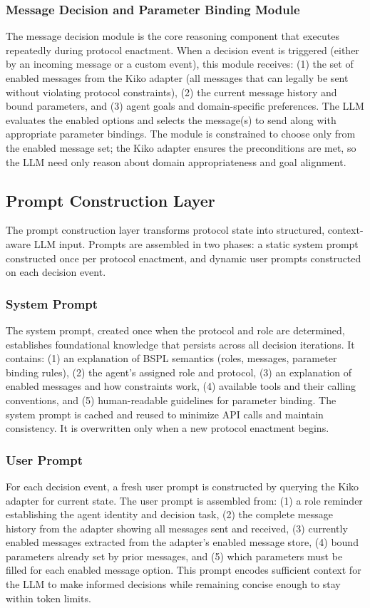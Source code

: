 \documentclass[runningheads]{llncs}
\begin{document}
\subsubsection{Message Decision and Parameter Binding Module}
The message decision module is the core reasoning component that executes repeatedly during protocol enactment. 
When a decision event is triggered (either by an incoming message or a custom event), this module receives: (1) the set of enabled messages from the Kiko adapter (all messages that can legally be sent without violating protocol constraints), (2) the current message history and bound parameters, and (3) agent goals and domain-specific preferences. 
The LLM evaluates the enabled options and selects the message(s) to send along with appropriate parameter bindings. 
The module is constrained to choose only from the enabled message set; the Kiko adapter ensures the preconditions are met, so the LLM need only reason about domain appropriateness and goal alignment.

\subsection{Prompt Construction Layer}

The prompt construction layer transforms protocol state into structured, context-aware LLM input. 
Prompts are assembled in two phases: a static system prompt constructed once per protocol enactment, and dynamic user prompts constructed on each decision event.

\subsubsection{System Prompt}
The system prompt, created once when the protocol and role are determined, establishes foundational knowledge that persists across all decision iterations. 
It contains: (1) an explanation of BSPL semantics (roles, messages, parameter binding rules), (2) the agent's assigned role and protocol, (3) an explanation of enabled messages and how constraints work, (4) available tools and their calling conventions, and (5) human-readable guidelines for parameter binding. 
The system prompt is cached and reused to minimize API calls and maintain consistency. 
It is overwritten only when a new protocol enactment begins.

\subsubsection{User Prompt}
For each decision event, a fresh user prompt is constructed by querying the Kiko adapter for current state. 
The user prompt is assembled from: (1) a role reminder establishing the agent identity and decision task, (2) the complete message history from the adapter showing all messages sent and received, (3) currently enabled messages extracted from the adapter's enabled message store, (4) bound parameters already set by prior messages, and (5) which parameters must be filled for each enabled message option. 
This prompt encodes sufficient context for the LLM to make informed decisions while remaining concise enough to stay within token limits.
\end{document}
